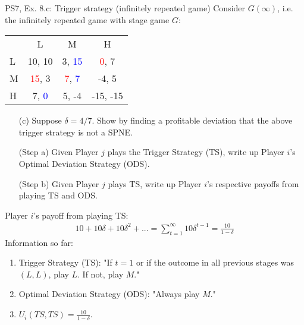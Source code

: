 \begin{frame}{PS7, Ex. 8.c: Trigger strategy (infinitely repeated game)}
    Consider $G(\infty)$, i.e. the infinitely repeated game with stage game $G$: \vspace{-6pt}
    \begin{table}
      \begin{tabular}{l|c|c|c|}
        \multicolumn{1}{c}{} & \multicolumn{1}{c}{L} & \multicolumn{1}{c}{M} & \multicolumn{1}{c}{H} \\\cline{2-4}
        L & 10, 10 & 3, \textcolor{blue}{15} & \textcolor{red}{0}, 7 \\\cline{2-4}
        M & \textcolor{red}{15}, 3 & \textcolor{red}{7}, \textcolor{blue}{7} & -4, 5 \\\cline{2-4}
        H & 7, \textcolor{blue}{0} & 5, -4 & -15, -15 \\\cline{2-4}
      \end{tabular}
    \end{table}
    \begin{itemize}
      \vspace{-4pt} \item[(c)] Suppose $\delta = 4/7$. Show by finding a profitable deviation that the above trigger strategy is not a SPNE. \vspace{-6pt}
    \end{itemize}
    \begin{multicols}{2}
      \begin{itemize}
        \item[(Step a)] Given Player $j$ plays the Trigger Strategy (TS), write up Player $i$'s Optimal Deviation Strategy (ODS).
        \item[(Step b)] Given Player $j$ plays TS, write up Player $i$'s respective payoffs from playing TS and ODS.
      \end{itemize}
      Player $i$'s payoff from playing TS:
      \begin{align*}
        10+10\delta+10\delta^2+...=\sum_{t=1}^\infty10\delta^{t-1}=\frac{10}{1-\delta}
      \end{align*}
      \vfill\null\columnbreak
      Information so far:
      \begin{enumerate}
        \item Trigger Strategy (TS): "If $t=1$ or if the outcome in all previous stages was $(L,L)$, play $L$. If not, play $M$."
        \item Optimal Deviation Strategy (ODS): "Always play $M$."
        \item $U_i(TS,TS)=\frac{10}{1-\delta}$.
      \end{enumerate}
      \vfill\null
    \end{multicols}
\end{frame}
